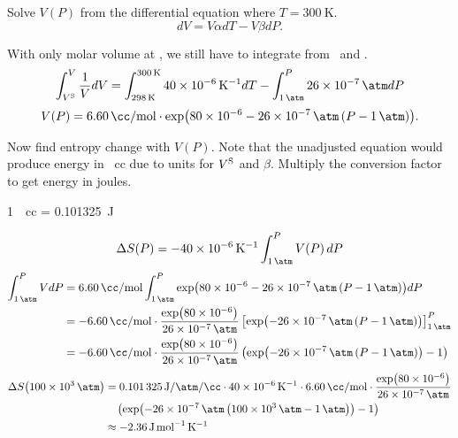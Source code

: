 \begin{@empty}
\begin{answer}
\begin{enumerate}
\begin{@empty}
                Solve $V(P)$ from the differential equation where $T =
                \SI{300}{\kelvin}$.
                \[ dV = V\alpha dT - V\beta dP.\]

                With only molar volume at \stdT, we still have to integrate
                from \stdT\ and \stdP.
                \[
                    \int_{V^{\text S}}^V \frac1V dV
                    = \int_{\stdT}^{\SI{300}{\kelvin}} \thisa dT
                    - \int_{\stdP}^P \thisb dP
                \]
                \[
                    V(P) = \thisVS \cdot \exp \Left( \exponent \Right).
                \]

                Now find entropy change with $V(P)$.  Note that the unadjusted
                equation would produce energy in \si{\atm.cc} due to units for
                $V^{\text S}$ and $\beta$.  Multiply the conversion factor to get
                energy in joules.
                \begin{center}
                    \SI{1}{\atm.cc} = \SI{0.101325}{\joule}
                \end{center}
                \[ \Delta S(P) = -\thisa \int_{\stdP}^P V(P)\,dP \]
                \begin{align*}
                    \int_{\stdP}^P V dP &= \thisVS \int_{\stdP}^P \exp \Left( \exponent \Right) dP \\
                    &= -\thisVS \cdot \frac{\exp \Left( \num{80e-6} \Right)}{\thisb}
                        \left[ \exp \Left( -\thisb \left( P - \stdP \right) \Right) \right]_{\stdP}^P \\
                    &= -\thisVS \cdot \frac{\exp \Left( \num{80e-6} \Right)}{\thisb}
                        \left( \exp \Left( -\thisb \left( P - \stdP \right) \Right) - 1 \right)
                \end{align*}
                \begin{align*}
                    \Delta S \Left( \SI{100e3}{\atm} \Right) &= \convert
                        \cdot \thisa \cdot \thisVS \cdot \frac{\exp \Left( \num{80e-6} \Right)}{\thisb} \\
                        &\quad \left( \exp \Left( -\thisb \left( \SI{100e3}{\atm} - \stdP \right) \Right) - 1 \right) \\
                        &\approx \SI{-2.36}{\joule\per\mol\per\kelvin}
                \end{align*}


\end{@empty}
\end{enumerate}
\end{answer}
\end{@empty}
